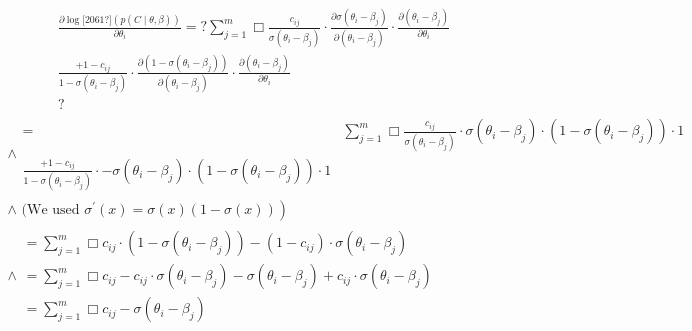 \documentclass[letterpaper]{article}
\begin{document}
\begin{equation*}
\begin{matrix}\frac{{\partial}\log \text{[2061?]}(p(C{\mid}\theta ,\beta ))}{{\partial}\theta _i}=?\sum _{j=1}^m\Box
\frac{c_{\mathit{ij}}}{\sigma \left(\theta _i-\beta _j\right)}{\cdot}\frac{{\partial}\sigma \left(\theta _i-\beta
_j\right)}{{\partial}\left(\theta _i-\beta _j\right)}{\cdot}\frac{{\partial}\left(\theta _i-\beta
_j\right)}{{\partial}\theta _i}\\\frac{+1-c_{\mathit{ij}}}{1-\sigma \left(\theta _i-\beta
_j\right)}{\cdot}\frac{{\partial}\left(1-\sigma \left(\theta _i-\beta _j\right)\right)}{{\partial}\left(\theta _i-\beta
_j\right)}{\cdot}\frac{{\partial}\left(\theta _i-\beta _j\right)}{{\partial}\theta _i}\\?\end{matrix}
\end{equation*}
\begin{equation*}
\begin{matrix}\wedge \begin{matrix}=&\sum _{j=1}^m\Box \frac{c_{\mathit{ij}}}{\sigma \left(\theta _i-\beta
_j\right)}{\cdot}\sigma \left(\theta _i-\beta _j\right){\cdot}\left(1-\sigma \left(\theta _i-\beta
_j\right)\right){\cdot}1\\\frac{+1-c_{\mathit{ij}}}{1-\sigma \left(\theta _i-\beta _j\right)}{\cdot}-\sigma
\left(\theta _i-\beta _j\right){\cdot}\left(1-\sigma \left(\theta _i-\beta _j\right)\right){\cdot}1\end{matrix}\\\wedge
\text{ (We used }\left.\sigma ^{'}(x)=\sigma (x)(1-\sigma (x))\right)\\\wedge \begin{matrix}=\sum _{j=1}^m\Box
c_{\mathit{ij}}{\cdot}\left(1-\sigma \left(\theta _i-\beta _j\right)\right)-\left(1-c_{\mathit{ij}}\right){\cdot}\sigma
\left(\theta _i-\beta _j\right)\\=\sum _{j=1}^m\Box c_{\mathit{ij}}-c_{\mathit{ij}}{\cdot}\sigma \left(\theta _i-\beta
_j\right)-\sigma \left(\theta _i-\beta _j\right)+c_{\mathit{ij}}{\cdot}\sigma \left(\theta _i-\beta _j\right)\\=\sum
_{j=1}^m\Box c_{\mathit{ij}}-\sigma \left(\theta _i-\beta _j\right)\end{matrix}\end{matrix}
\end{equation*}

\bigskip
\end{document}
